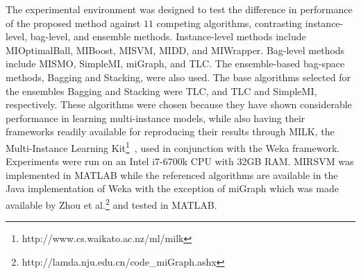 \documentclass[reqno]{vcuthesis}
\numberwithin{equation}{chapter}
\begin{document}
\begin{table}[t!]
\centering
\caption{Multi-Instance (MI) Classification datasets}
\small
\label{tab:Dataset}
\end{table}

The experimental environment was designed to test the difference in performance of the proposed method against $11$ competing algorithms, contrasting instance-level, bag-level, and ensemble methods. Instance-level methods include MIOptimalBall, MIBoost, MISVM, MIDD, and MIWrapper. Bag-level methods include MISMO, SimpleMI, miGraph, and TLC. The ensemble-based bag-space methods, Bagging and Stacking, were also used. The base algorithms selected for the ensembles Bagging and Stacking were TLC, and TLC and SimpleMI, respectively. These algorithms were chosen because they have shown considerable performance in learning multi-instance models, while also having their frameworks readily available for reproducing their results through MILK, the Multi-Instance Learning Kit\footnote{http://www.cs.waikato.ac.nz/ml/milk}~\cite{Xu2003}, used in conjunction with the Weka framework. Experiments were run on an Intel i7-6700k CPU with 32GB RAM. MIRSVM was implemented in MATLAB while the referenced algorithms are available in the Java implementation of Weka with the exception of miGraph which was made available by Zhou et al.\footnote{http://lamda.nju.edu.cn/code\_miGraph.ashx} and tested in MATLAB.
\end{document}

